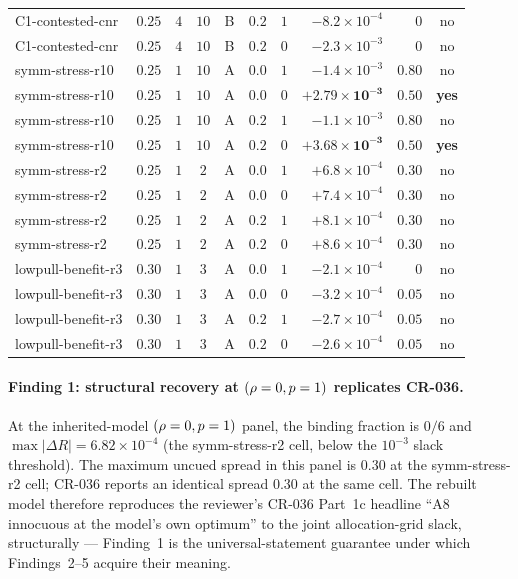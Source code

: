 \begin{table}[t]
\begin{tabular}{l c c c c c r r r c}
    C1-contested-cnr  & $0.25$   & $4$ & $10$    & B & $0.2$ & $1$
      & $-8.2\!\times\!10^{-4}$ & $0$ & no \\
    C1-contested-cnr  & $0.25$   & $4$ & $10$    & B & $0.2$ & $0$
      & $-2.3\!\times\!10^{-3}$ & $0$ & no \\
    \addlinespace
    symm-stress-r10   & $0.25$   & $1$ & $10$    & A & $0.0$ & $1$
      & $-1.4\!\times\!10^{-3}$ & $0.80$ & no \\
    symm-stress-r10   & $0.25$   & $1$ & $10$    & A & $0.0$ & $0$
      & $\mathbf{+2.79\!\times\!10^{-3}}$ & $0.50$ & \textbf{yes} \\
    symm-stress-r10   & $0.25$   & $1$ & $10$    & A & $0.2$ & $1$
      & $-1.1\!\times\!10^{-3}$ & $0.80$ & no \\
    symm-stress-r10   & $0.25$   & $1$ & $10$    & A & $0.2$ & $0$
      & $\mathbf{+3.68\!\times\!10^{-3}}$ & $0.50$ & \textbf{yes} \\
    \addlinespace
    symm-stress-r2    & $0.25$   & $1$ & $2$     & A & $0.0$ & $1$
      & $+6.8\!\times\!10^{-4}$ & $0.30$ & no \\
    symm-stress-r2    & $0.25$   & $1$ & $2$     & A & $0.0$ & $0$
      & $+7.4\!\times\!10^{-4}$ & $0.30$ & no \\
    symm-stress-r2    & $0.25$   & $1$ & $2$     & A & $0.2$ & $1$
      & $+8.1\!\times\!10^{-4}$ & $0.30$ & no \\
    symm-stress-r2    & $0.25$   & $1$ & $2$     & A & $0.2$ & $0$
      & $+8.6\!\times\!10^{-4}$ & $0.30$ & no \\
    \addlinespace
    lowpull-benefit-r3 & $0.30$ & $1$ & $3$ & A & $0.0$ & $1$
      & $-2.1\!\times\!10^{-4}$ & $0$    & no \\
    lowpull-benefit-r3 & $0.30$ & $1$ & $3$ & A & $0.0$ & $0$
      & $-3.2\!\times\!10^{-4}$ & $0.05$ & no \\
    lowpull-benefit-r3 & $0.30$ & $1$ & $3$ & A & $0.2$ & $1$
      & $-2.7\!\times\!10^{-4}$ & $0.05$ & no \\
    lowpull-benefit-r3 & $0.30$ & $1$ & $3$ & A & $0.2$ & $0$
      & $-2.6\!\times\!10^{-4}$ & $0.05$ & no \\
    \bottomrule
  \end{tabular}
\end{table}

\paragraph{Finding 1: structural recovery at $(\rho = 0, p = 1)$
replicates CR-036.}
At the inherited-model $(\rho = 0, p = 1)$ panel, the binding fraction
is $0/6$ and $\max|\Delta R| = 6.82\!\times\!10^{-4}$ (the
symm-stress-r2 cell, below the $10^{-3}$ slack threshold). The maximum
uncued spread in this panel is $0.30$ at the symm-stress-r2 cell; CR-036
reports an identical spread $0.30$ at the same cell. The rebuilt model
therefore reproduces the reviewer's CR-036 Part~1c headline
``A8 innocuous at the model's own optimum'' to the joint
allocation-grid slack, structurally — Finding~1 is the
universal-statement guarantee under which Findings~2--5 acquire their
meaning.

